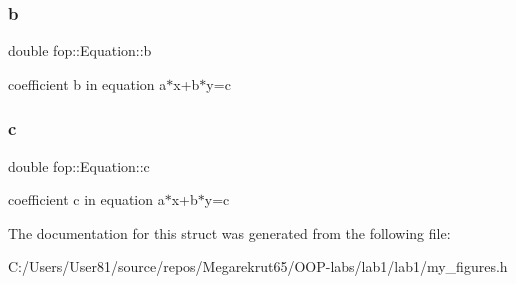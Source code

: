 \subsubsection{\texorpdfstring{b}{b}}
{\footnotesize\ttfamily double fop\+::\+Equation\+::b}

coefficient b in equation a$\ast$x+b$\ast$y=c \mbox{\label{structfop_1_1_equation_a795ea1202f12b407544c305d79e39872}} 
\subsubsection{\texorpdfstring{c}{c}}
{\footnotesize\ttfamily double fop\+::\+Equation\+::c}

coefficient c in equation a$\ast$x+b$\ast$y=c 

The documentation for this struct was generated from the following file\+:\begin{DoxyCompactItemize}
\item 
C\+:/\+Users/\+User81/source/repos/\+Megarekrut65/\+O\+O\+P-\/labs/lab1/lab1/my\+\_\+figures.\+h\end{DoxyCompactItemize}
